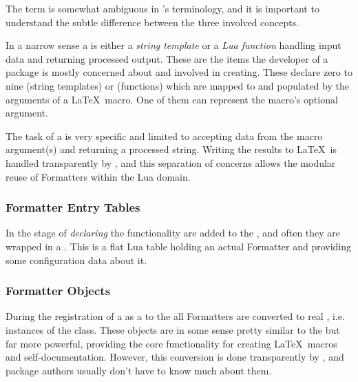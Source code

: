\documentclass[12pt]{scrartcl}
\begin{document}
The term  is somewhat ambiguous in \luatemplates's terminology, and it is important to understand the subtle difference between the three involved concepts.

In a narrow sense a  is either a \emph{string template} or a
\emph{Lua function} handling input data and returning processed output.  These
are the items the developer of a package is mostly concerned about and involved
in creating.  These  declare zero to nine
 (string templates) or  (functions) which are mapped to and populated by the
arguments of a \LaTeX\ macro.  One of them can represent the macro's optional
argument.

The task of a  is very specific and limited to accepting data
from the macro argument(s) and returning a processed string.  Writing the
results to \LaTeX\ is handled transparently by \luatemplates, and this
separation of concerns allows the modular reuse of Formatters within the Lua
domain.


\subsubsection{Formatter Entry Tables}
\label{sec:intro-formatter-entry-tables}

In the stage of \emph{declaring} the functionality 
are added to the , and often they are wrapped in a
.  This is a flat Lua table holding an actual
Formatter and providing some configuration data about it.


\subsubsection{Formatter Objects}
\label{sec:intro-formatter-objects}

During the registration of a  as a  to the
 all Formatters are converted to real , i.e. instances of the  class.
These objects are in some sense pretty similar to the  but far more powerful, providing the core
functionality for creating \LaTeX\ macros and self-documentation. However, this
conversion is done transparently by \luatemplates, and package authors
usually don't have to know much about them.
\end{document}
